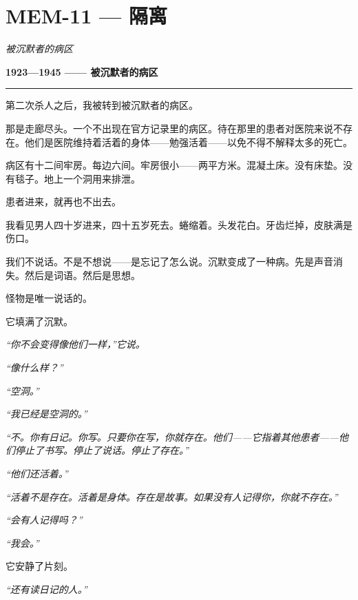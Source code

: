 \section*{\textbf{MEM-11} --- 隔离}

\noindent \textit{被沉默者的病区}

\noindent \textbf{1923—1945 —— 被沉默者的病区}

\vspace{0.5em}\noindent\rule{\textwidth}{0.5pt}\vspace{0.5em}

\noindent 第二次杀人之后，我被转到被沉默者的病区。

\noindent 那是走廊尽头。一个不出现在官方记录里的病区。待在那里的患者对医院来说不存在。他们是医院维持着活着的身体——勉强活着——以免不得不解释太多的死亡。

\noindent 病区有十二间牢房。每边六间。牢房很小——两平方米。混凝土床。没有床垫。没有毯子。地上一个洞用来排泄。

\noindent 患者进来，就再也不出去。

\noindent 我看见男人四十岁进来，四十五岁死去。蜷缩着。头发花白。牙齿烂掉，皮肤满是伤口。

\noindent 我们不说话。不是不想说——是忘记了怎么说。沉默变成了一种病。先是声音消失。然后是词语。然后是思想。

\noindent 怪物是唯一说话的。

\noindent 它填满了沉默。

\noindent \textit{“你不会变得像他们一样，”它说。}

\noindent \textit{“像什么样？”}

\noindent \textit{“空洞。”}

\noindent \textit{“我已经是空洞的。”}

\noindent \textit{“不。你有日记。你写。只要你在写，你就存在。他们——}\textit{它指着其他患者}\textit{——他们停止了书写。停止了说话。停止了存在。”}

\noindent \textit{“他们还活着。”}

\noindent \textit{“活着不是存在。活着是身体。存在是故事。如果没有人记得你，你就不存在。”}

\noindent \textit{“会有人记得吗？”}

\noindent \textit{“我会。”}

\noindent 它安静了片刻。

\noindent \textit{“还有读日记的人。”}

